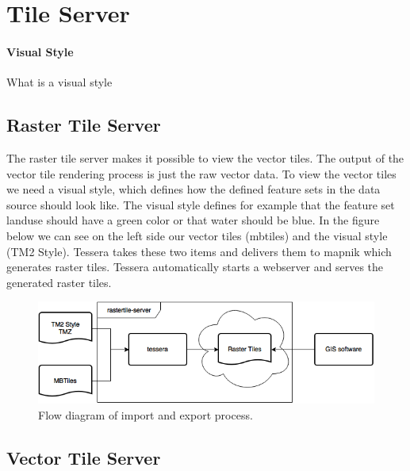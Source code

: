 \section{Tile Server}

\paragraph{Visual Style} What is a visual style

\subsection{Raster Tile Server}

The raster tile server makes it possible to view the vector tiles. The output of the vector tile rendering process is just the raw vector data. To view the vector tiles we need a visual style, which defines how the defined feature sets in the data source should look like. The visual style defines for example that the feature set landuse should have a green color or that water should be blue. In the figure below we can see on the left side our vector tiles (mbtiles) and the visual style (TM2 Style). Tessera takes these two items and delivers them to mapnik which generates raster tiles. Tessera automatically starts a webserver and serves the generated raster tiles.

\begin{figure}[h]

  \centering
  \includegraphics[width=1\textwidth]{images/rastertiles-server.png}
  \caption{Flow diagram of import and export process.}
\end{figure}

\subsection{Vector Tile Server}




\newpage